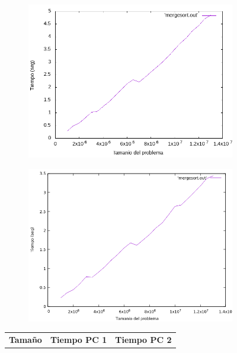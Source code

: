 \documentclass[12pt,spanish]{article}
\begin{document}
\begin{figure}[H]
\centering
\begin{subfigure}[b]{0.45\textwidth}
\includegraphics[scale=0.45]{empirica_mergesort.png}
\caption{}
\end{subfigure}
\quad
\begin{subfigure}[b]{0.45\textwidth}
\includegraphics[scale=0.45]{empirica_mergesort_2.png}
\caption{}
\end{subfigure}
\newline
\newline
\begin{tabular}{|c|c|c|}
\hline
\textbf{Tamaño} & \textbf{Tiempo PC 1} & \textbf{Tiempo PC 2} \\

\end{tabular}
\end{figure}
\end{document}
